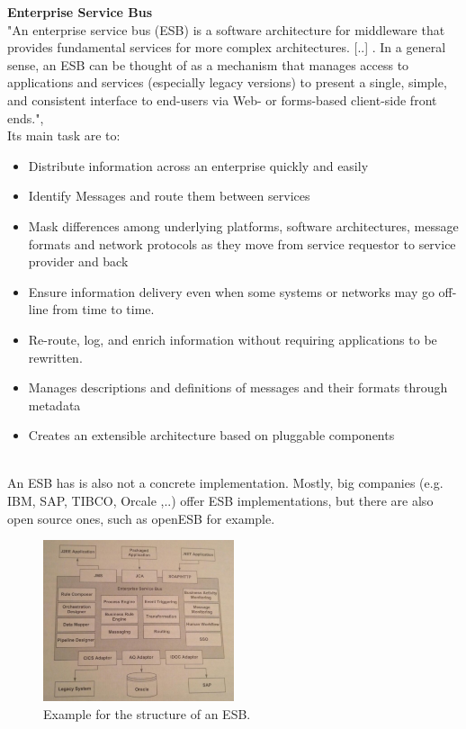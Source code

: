 \documentclass[12pt]{article}
\begin{document}
\FloatBarrier \newpage \noindent
\textbf{Enterprise Service Bus} \\
"An enterprise service bus (ESB) is a software architecture for middleware that provides fundamental services for more complex architectures. [..] . In a general sense, an ESB can be thought of as a mechanism that manages access to applications and services (especially legacy versions) to present a single, simple, and consistent interface to end-users via Web- or forms-based client-side front ends.", \cite{esbdef}\\
Its main task are to:
\begin{itemize}
\item Distribute information across an enterprise quickly and easily
\item Identify Messages and route them between services
\item Mask differences among underlying platforms, software architectures, message formats and network protocols as they move from service requestor to service provider and back
\item Ensure information delivery even when some systems or networks may go off-line from time to time.
\item Re-route, log, and enrich information without requiring applications to be rewritten.
\item Manages descriptions and definitions of messages and their formats through metadata
\item Creates an extensible architecture based on pluggable components
\end{itemize} \cite{esbdef,esbimplpatt} \\
An ESB has is also not a concrete implementation. Mostly, big companies (e.g. IBM, SAP, TIBCO, Orcale ,..) offer ESB implementations, but there are also open source ones, such as openESB for example.
\begin{figure}[here!]
	\centering
	\includegraphics[width=0.5\textwidth]{images/page137sgr}
	  \caption{Example for the structure of an ESB. \cite[page 137]{soagoesreal}}
    \label{fig:context}
	\end{figure}
\end{document}
